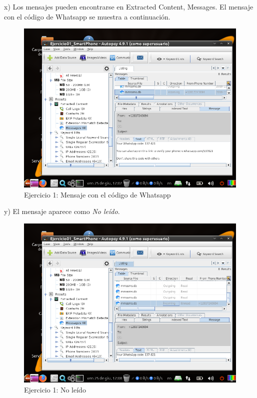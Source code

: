 \documentclass[11pt]{article}
\begin{document}
x) Los mensajes pueden encontrarse en Extracted Content, Messages. El mensaje con el código de Whatsapp se muestra a continuación.

\begin{figure}[H]
    \caption{Ejercicio 1: Mensaje con el código de Whatsapp}
    \centering
    \includegraphics[scale=0.7]{e1-23.png}
\end{figure}

y) El mensaje aparece como \textit{No leído}.

\begin{figure}[H]
    \caption{Ejercicio 1: No leído}
    \centering
    \includegraphics[scale=0.7]{e1-24.png}
\end{figure}
\end{document}

